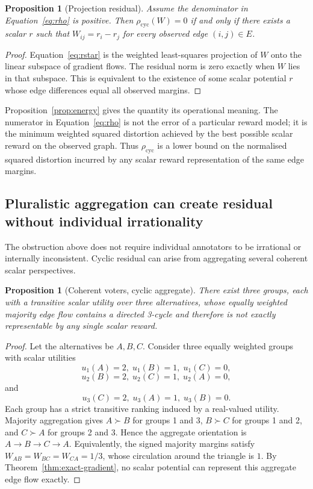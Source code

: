 \documentclass[10pt]{article}
\newtheorem{proposition}[theorem]{Proposition}
\theoremstyle{definition}
\theoremstyle{remark}
\begin{document}
\begin{proposition}[Projection residual]\label{prop:residual}
Assume the denominator in Equation~\eqref{eq:rho} is positive. Then $\rho_{\mathrm{cyc}}(W)=0$ if and only if there exists a scalar $r$ such that $W_{ij}=r_i-r_j$ for every observed edge $(i,j)\in E$.
\end{proposition}
\begin{proof}
Equation~\eqref{eq:rstar} is the weighted least-squares projection of $W$ onto the linear subspace of gradient flows. The residual norm is zero exactly when $W$ lies in that subspace. This is equivalent to the existence of some scalar potential $r$ whose edge differences equal all observed margins.
\end{proof}

Proposition~\ref{prop:energy} gives the quantity its operational meaning. The numerator in Equation~\eqref{eq:rho} is not the error of a particular reward model; it is the minimum weighted squared distortion achieved by the best possible scalar reward on the observed graph. Thus $\rho_{\mathrm{cyc}}$ is a lower bound on the normalised squared distortion incurred by any scalar reward representation of the same edge margins.

\subsection{Pluralistic aggregation can create residual without individual irrationality}

The obstruction above does not require individual annotators to be irrational or internally inconsistent. Cyclic residual can arise from aggregating several coherent scalar perspectives.

\begin{proposition}[Coherent voters, cyclic aggregate]\label{prop:pluralism-cycle}
There exist three groups, each with a transitive scalar utility over three alternatives, whose equally weighted majority edge flow contains a directed 3-cycle and therefore is not exactly representable by any single scalar reward.
\end{proposition}
\begin{proof}
Let the alternatives be $A,B,C$. Consider three equally weighted groups with scalar utilities
\[
u_1(A)=2,\;u_1(B)=1,\;u_1(C)=0,
\]
\[
u_2(B)=2,\;u_2(C)=1,\;u_2(A)=0,
\]
and
\[
u_3(C)=2,\;u_3(A)=1,\;u_3(B)=0.
\]
Each group has a strict transitive ranking induced by a real-valued utility. Majority aggregation gives $A\succ B$ for groups 1 and 3, $B\succ C$ for groups 1 and 2, and $C\succ A$ for groups 2 and 3. Hence the aggregate orientation is $A\to B\to C\to A$. Equivalently, the signed majority margins satisfy $W_{AB}=W_{BC}=W_{CA}=1/3$, whose circulation around the triangle is $1$. By Theorem~\ref{thm:exact-gradient}, no scalar potential can represent this aggregate edge flow exactly.
\end{proof}
\end{document}
